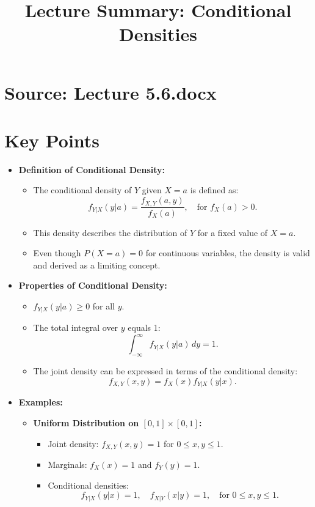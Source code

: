 \documentclass{article}
\title{Lecture Summary: Conditional Densities}
\author{}
\date{}
\begin{document}
\maketitle

\section*{Source: Lecture 5.6.docx}

\section*{Key Points}

\begin{itemize}
  \item \textbf{Definition of Conditional Density:}
    \begin{itemize}
      \item The conditional density of $Y$ given $X = a$ is defined as:
        \[
          f_{Y|X}(y|a) = \frac{f_{X,Y}(a, y)}{f_X(a)}, \quad \text{for } f_X(a) > 0.
        \]
      \item This density describes the distribution of $Y$ for a fixed value of $X = a$.
      \item Even though $P(X = a) = 0$ for continuous variables, the density is valid and derived as a limiting concept.
    \end{itemize}

  \item \textbf{Properties of Conditional Density:}
    \begin{itemize}
      \item $f_{Y|X}(y|a) \geq 0$ for all $y$.
      \item The total integral over $y$ equals 1:
        \[
          \int_{-\infty}^\infty f_{Y|X}(y|a) \, dy = 1.
        \]
      \item The joint density can be expressed in terms of the conditional density:
        \[
          f_{X,Y}(x,y) = f_X(x) f_{Y|X}(y|x).
        \]
    \end{itemize}

  \item \textbf{Examples:}
    \begin{itemize}
      \item \textbf{Uniform Distribution on $[0, 1] \times [0, 1]$:}
        \begin{itemize}
          \item Joint density: $f_{X,Y}(x,y) = 1$ for $0 \leq x, y \leq 1$.
          \item Marginals: $f_X(x) = 1$ and $f_Y(y) = 1$.
          \item Conditional densities:
            \[
              f_{Y|X}(y|x) = 1, \quad f_{X|Y}(x|y) = 1, \quad \text{for } 0 \leq x, y \leq 1.
            \]
        \end{itemize}


\end{itemize}
\end{itemize}
\end{document}
